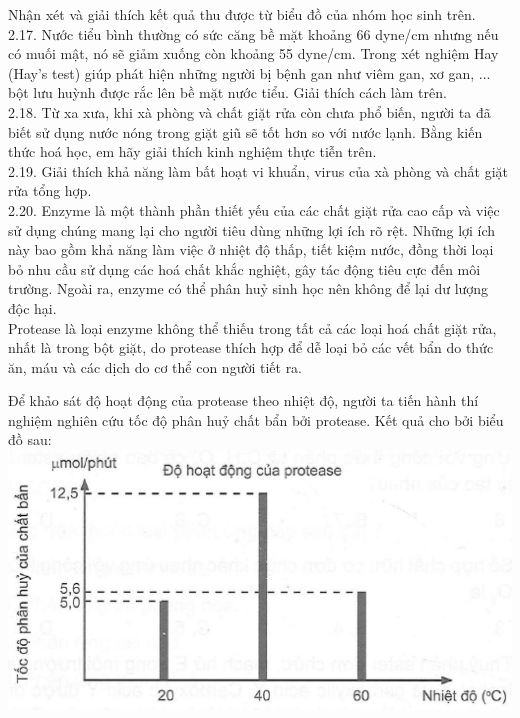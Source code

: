 \documentclass[10pt]{article}
\begin{document}
Nhận xét và giải thích kết quả thu được từ biểu đồ của nhóm học sinh trên.\\
2.17. Nước tiểu bình thường có sức căng bề mặt khoảng 66 dyne/cm nhưng nếu có muối mật, nó sẽ giảm xuống còn khoảng 55 dyne/cm. Trong xét nghiệm Hay (Hay's test) giúp phát hiện những người bị bệnh gan như viêm gan, xơ gan, ... bột lưu huỳnh được rắc lên bề mặt nước tiểu. Giải thích cách làm trên.\\
2.18. Từ xa xưa, khi xà phòng và chất giặt rửa còn chưa phổ biến, người ta đã biết sử dụng nước nóng trong giặt giũ sẽ tốt hơn so với nước lạnh. Bằng kiến thức hoá học, em hãy giải thích kinh nghiệm thực tiễn trên.\\
2.19. Giải thích khả năng làm bất hoạt vi khuẩn, virus của xà phòng và chất giặt rửa tổng hợp.\\
2.20. Enzyme là một thành phần thiết yếu của các chất giặt rửa cao cấp và việc sử dụng chúng mang lại cho người tiêu dùng những lợi ích rõ rệt. Những lợi ích này bao gồm khả năng làm việc ở nhiệt độ thấp, tiết kiệm nước, đồng thời loại bỏ nhu cầu sử dụng các hoá chất khắc nghiệt, gây tác động tiêu cực đến môi trường. Ngoài ra, enzyme có thể phân huỷ sinh học nên không để lại dư lượng độc hại.\\
Protease là loại enzyme không thể thiếu trong tất cả các loại hoá chất giặt rửa, nhất là trong bột giặt, do protease thích hợp để dễ loại bỏ các vết bẩn do thức ăn, máu và các dịch do cơ thể con người tiết ra.

Để khảo sát độ hoạt động của protease theo nhiệt độ, người ta tiến hành thí nghiệm nghiên cứu tốc độ phân huỷ chất bẩn bởi protease. Kết quả cho bởi biểu đồ sau:\\
\includegraphics[max width=\textwidth, center]{2025_10_23_de6f5713836e4e91b3c8g-011}
\end{document}
